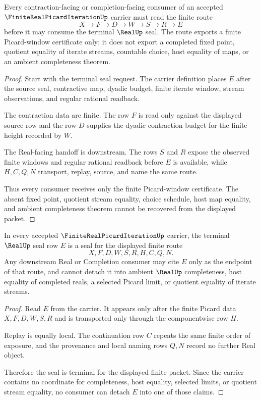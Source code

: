 \begin{theorem}
\label{thm:finite-real-picard-iteration-contractive-window}
Every contraction-facing or completion-facing consumer of an accepted $\FiniteRealPicardIterationUp$ carrier must read the finite route
$$
X \longrightarrow F \longrightarrow D \longrightarrow W \longrightarrow S \longrightarrow R \longrightarrow E
$$
before it may consume the terminal $\RealUp$ seal. The route exports a finite Picard-window certificate only; it does not export a completed fixed point, quotient equality of iterate streams, countable choice, host equality of maps, or an ambient completeness theorem.
\end{theorem}
\begin{proof}
Start with the terminal seal request. The carrier definition places $E$ after the source seal, contractive map, dyadic budget, finite iterate window, stream observations, and regular rational readback.

The contraction data are finite. The row $F$ is read only against the displayed source row and the row $D$ supplies the dyadic contraction budget for the finite height recorded by $W$.

The Real-facing handoff is downstream. The rows $S$ and $R$ expose the observed finite windows and regular rational readback before $E$ is available, while $H,C,Q,N$ transport, replay, source, and name the same route.

Thus every consumer receives only the finite Picard-window certificate. The absent fixed point, quotient stream equality, choice schedule, host map equality, and ambient completeness theorem cannot be recovered from the displayed packet.
\end{proof}

\begin{theorem}
\label{thm:finite-real-picard-iteration-real-seal-nonescape}
In every accepted $\FiniteRealPicardIterationUp$ carrier, the terminal $\RealUp$ seal row $E$ is a seal for the displayed finite route
$$
X,F,D,W,S,R,H,C,Q,N .
$$
Any downstream Real or Completion consumer may cite $E$ only as the endpoint of that route, and cannot detach it into ambient $\RealUp$ completeness, host equality of completed reals, a selected Picard limit, or quotient equality of iterate streams.
\end{theorem}
\begin{proof}
Read $E$ from the carrier. It appears only after the finite Picard data $X,F,D,W,S,R$ and is transported only through the componentwise row $H$.

Replay is equally local. The continuation row $C$ repeats the same finite order of exposure, and the provenance and local naming rows $Q,N$ record no further Real object.

Therefore the seal is terminal for the displayed finite packet. Since the carrier contains no coordinate for completeness, host equality, selected limits, or quotient stream equality, no consumer can detach $E$ into one of those claims.
\end{proof}

